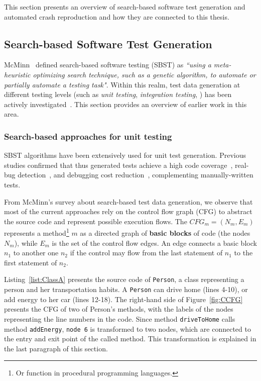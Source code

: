 This section presents an overview of search-based software test generation and automated crash reproduction and how they are connected to this thesis.

\subsection{Search-based Software Test Generation}

McMinn~\cite{McMinn2004} defined search-based software testing (SBST) as \textit{``using a meta-heuristic optimizing search technique, such as a genetic algorithm, to automate or partially automate a testing task"}.
Within this realm, test data generation at different testing levels (such as \textit{unit testing}, \textit{integration testing}, \etc) has been actively investigated~\cite{McMinn2004}. This section 
provides an overview of earlier work in this area.

\subsubsection{Search-based approaches for unit testing}
SBST algorithms have been extensively used for unit test generation. Previous studies confirmed that thus generated tests achieve a high code coverage~\cite{Panichella2018a, Campos2018}, real-bug detection~\cite{almasi2017industrial}, and debugging cost reduction~\cite{soltani2017, Panichella2016}, complementing manually-written tests.

From McMinn's \cite{McMinn2004} survey about search-based test data generation, we observe that most of the current approaches rely on the control flow graph (CFG) to abstract the source code and represent possible execution flows. The $CFG_m=(N_m,E_m)$ represents a method\footnote{Or function in procedural programming languages.} $m$ as a directed graph of \textbf{basic blocks} of code (the nodes $N_m$), while $E_m$ is the set of the control flow edges. An edge connects a basic block $n_1$ to another one $n_2$ if the control may flow from the last statement of $n_1$ to the first statement of $n_2$. 

Listing~\ref{list:ClassA} presents the source code of \texttt{Person}, a class representing a person and her transportation habits. A \texttt{Person} can drive home (lines 4-10), or add energy to her car (lines 12-18). The right-hand side of Figure~\ref{fig:CCFG} presents the CFG of two of Person's methods, with the labels of the nodes representing the line numbers in the code. Since method \texttt{driveToHome} calls method \texttt{addEnergy}, \texttt{node 6} is transformed to two nodes, which are connected to the entry and exit point of the called method. This transformation is explained in the last paragraph of this section.  


